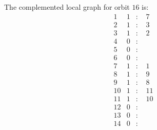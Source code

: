 \documentclass[12pt]{article}
\begin{document}
The complemented local graph for orbit $16$ is:
\begin{equation*}
\begin{array}{rrcl}
1&1&:&\,\,7\\
2&1&:&\,\,3\\
3&1&:&\,\,2\\
4&0&:&\\
5&0&:&\\
6&0&:&\\
7&1&:&\,\,1\\
8&1&:&\,\,9\\
9&1&:&\,\,8\\
10&1&:&\,\,11\\
11&1&:&\,\,10\\
12&0&:&\\
13&0&:&\\
14&0&:&\\
\end{array}
\end{equation*}
\end{document}

